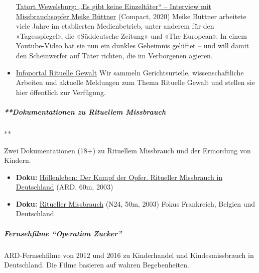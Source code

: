 \begin{itemize}
  \href{https://www.compact-online.de/tatort-wewelsburg-es-gibt-keine-einzeltaeter-interview-mit-missbrauchsopfer-meike-buettner/}{Tatort
  Wewelsburg: „Es gibt keine Einzeltäter`` -- Interview mit
  Missbrauchsopfer Meike Büttner} (Compact, 2020) Meike Büttner
  arbeitete viele Jahre im etablierten Medienbetrieb, unter anderem für
  den «Tagesspiegel», die «Süddeutsche Zeitung» und «The European». In
  einem Youtube-Video hat sie nun ein dunkles Geheimnis gelüftet -- und
  will damit den Scheinwerfer auf Täter richten, die im Verborgenen
  agieren.
\item
  \href{https://www.infoportal-rg.de/}{Infoportal Rituelle Gewalt} Wir
  sammeln Gerichtsurteile, wissenschaftliche Arbeiten und aktuelle
  Meldungen zum Thema Rituelle Gewalt und stellen sie hier öffentlich
  zur Verfügung.
\end{itemize}

\hypertarget{dokumentationen-zu-rituellem-missbrauch}{%
\subparagraph{**Dokumentationen zu Rituellem
Missbrauch}\label{dokumentationen-zu-rituellem-missbrauch}}

**

Zwei Dokumentationen (18+) zu Rituellem Missbrauch und der Ermordung von
Kindern.

\begin{itemize}
\tightlist
\item
  \textbf{Doku:}
  \href{https://www.youtube.com/watch?v=KoP31LIm81s}{Höllenleben: Der
  Kampf der Opfer. Ritueller Missbrauch in Deutschland} (ARD, 60m, 2003)
\item
  \textbf{Doku:}
  \href{https://archive.org/details/n-24-doku-hollenleben-ritueller-kindesmissbrauch}{Ritueller
  Missbrauch} (N24, 50m, 2003) Fokus Frankreich, Belgien und Deutschland
\end{itemize}

\hypertarget{fernsehfilme-operation-zucker}{%
\subparagraph{\texorpdfstring{\textbf{Fernsehfilme ``Operation
Zucker''}}{Fernsehfilme ``Operation Zucker''}}\label{fernsehfilme-operation-zucker}}

ARD-Fernsehfilme von 2012 und 2016 zu Kinderhandel und Kindesmissbrauch
in Deutschland. Die Filme basieren auf wahren Begebenheiten.

